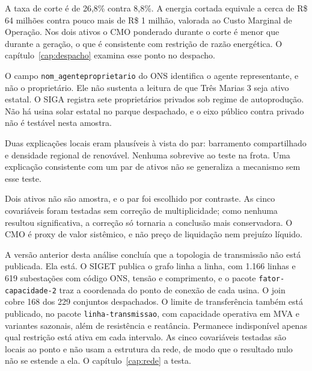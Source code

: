 A taxa de corte é de 26,8\% contra 8,8\%. A energia cortada equivale a cerca de
R\$ 64 milhões contra pouco mais de R\$ 1 milhão, valorada ao Custo Marginal de
Operação. Nos dois ativos o CMO ponderado durante o corte é menor que durante a
geração, o que é consistente com restrição de razão energética. O
capítulo~\ref{cap:despacho} examina esse ponto no despacho.

 O campo \texttt{nom\_\allowbreak agenteproprietario} do
ONS identifica o agente representante, e não o proprietário. Ele não sustenta a
leitura de que Três Marias 3 seja ativo estatal. O SIGA registra sete
proprietários privados sob regime de autoprodução. Não há usina solar estatal no
parque despachado, e o eixo público contra privado não é testável nesta amostra.


Duas explicações locais eram plausíveis à vista do par: barramento compartilhado
e densidade regional de renovável. Nenhuma sobrevive ao teste na frota. Uma
explicação consistente com um par de ativos não se generaliza a mecanismo sem
esse teste.

\begin{objecao}
Dois ativos não são amostra, e o par foi escolhido por contraste. As cinco
covariáveis foram testadas sem correção de multiplicidade; como nenhuma
resultou significativa, a correção só tornaria a conclusão mais conservadora. O
CMO é proxy de valor sistêmico, e não preço de liquidação nem prejuízo líquido.
\end{objecao}

 A versão anterior
desta análise concluía que a topologia de transmissão não está publicada. Ela
está. O SIGET publica o grafo linha a linha, com 1.166 linhas e 619 subestações
com código ONS, tensão e comprimento, e o pacote \texttt{fator-\allowbreak capacidade-2}
traz a coordenada do ponto de conexão de cada usina. O join cobre 168 dos 229
conjuntos despachados. O limite de transferência também está publicado, no
pacote \texttt{linha-\allowbreak transmissao}, com capacidade operativa em MVA e variantes
sazonais, além de resistência e reatância. Permanece indisponível apenas qual
restrição está ativa em cada intervalo. As cinco covariáveis testadas são locais
ao ponto e não usam a estrutura da rede, de modo que o resultado nulo não se
estende a ela. O capítulo~\ref{cap:rede} a testa.

